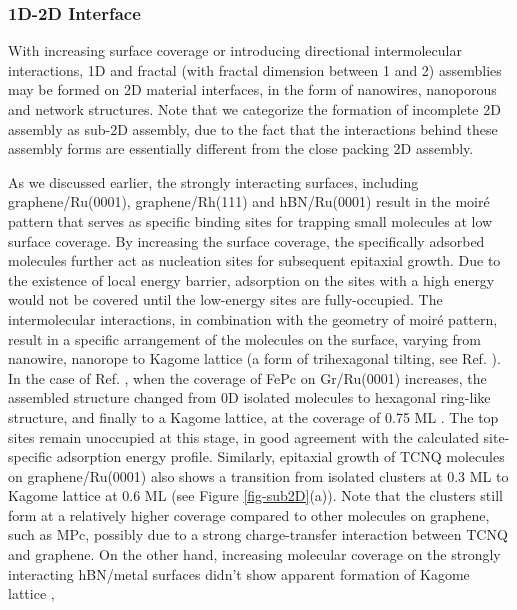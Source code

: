 \subsubsection{1D-2D Interface}
\label{sec:orgeadf57e}

With increasing surface coverage or introducing directional
intermolecular interactions, 1D and fractal (with fractal
dimension between 1 and 2) assemblies may be formed on 2D material
interfaces, in the form of nanowires, nanoporous and network
structures. Note that we categorize the formation of incomplete 2D
assembly as sub-2D assembly, due to the fact that the interactions
behind these assembly forms are essentially different from the close
packing 2D assembly.

As we discussed earlier, the strongly interacting surfaces, including
graphene/Ru(0001), graphene/Rh(111) and hBN/Ru(0001) result in the
moiré pattern that serves as specific binding sites for trapping
small molecules at low surface coverage. By increasing the surface
coverage, the specifically adsorbed molecules further act as
nucleation sites for subsequent epitaxial growth. Due to the existence
of local energy barrier, adsorption on the sites with a high energy
would not be covered until the low-energy sites are
fully-occupied. The intermolecular interactions, in combination with
the geometry of moiré pattern, result in a specific arrangement of
the molecules on the surface, varying from nanowire, nanorope to
Kagome lattice (a form of trihexagonal tilting, see
Ref. ). In the case of
Ref. , when the coverage of FePc on
Gr/Ru(0001) increases, the assembled structure changed from 0D
isolated molecules to hexagonal ring-like structure, and finally to a
Kagome lattice, at the coverage of 0.75 ML
\cite{Mao_2009_Pc_gr_kagome}. The top sites remain unoccupied at this
stage, in good agreement with the calculated site-specific adsorption
energy profile. Similarly, epitaxial growth of TCNQ molecules on
graphene/Ru(0001) also shows a transition from isolated clusters at
0.3 ML to Kagome lattice at 0.6 ML \cite{Maccariello_2014_TCNQ_gr_Ru}
(see Figure \ref{fig-sub2D}(a)). Note that the clusters still form at a
relatively higher coverage compared to other molecules on graphene,
such as MPc, possibly due to a strong charge-transfer interaction
between TCNQ and graphene. On the other hand, increasing molecular
coverage on the strongly interacting hBN/metal surfaces didn't show
apparent formation of Kagome lattice
\cite{Schulz_2013_copc_hbn_moire,Schulz_2014_hBN_moire,Iannuzzi_2014_MPc_hBN_Rh,Joshi_2014_TCNQ_hBN},

